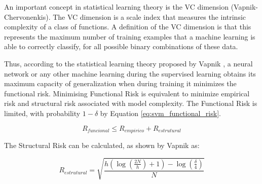An important concept in statistical learning theory is the VC dimension (Vapnik-Chervonenkis). The VC dimension is a scale index that measures the intrinsic complexity of a class of functions. A definition of the VC dimension is that this represents the maximum number of training examples that a machine learning is able to correctly classify, for all possible binary combinations of these data.

Thus, according to the statistical learning theory proposed by Vapnik \cite{vapnik1998statistical}, a neural network or any other machine learning during the supervised learning obtains its maximum capacity of generalization when during training it minimizes the functional risk. Minimising Functional Risk is equivalent to minimize empirical risk and structural risk associated with model complexity. The Functional Risk is limited, with probability $1 - \delta$ by Equation \ref{eq:svm_functional_risk}.

\begin{equation}
\label{eq:svm_functional_risk}
R_{funcional} \leq R_{empirico} + R_{estrutural}
\end{equation}

The Structural Risk can be calculated, as shown by Vapnik \cite{vapnik1998statistical} as:

\begin{equation}
\label{eq:svm_structural_risk}
R_{estrutural} = \sqrt{\frac{h \left( \log \left( \frac{2N}{h} \right) + 1 \right) - \log \left( \frac{\delta}{4} \right)}{N}}
\end{equation}

